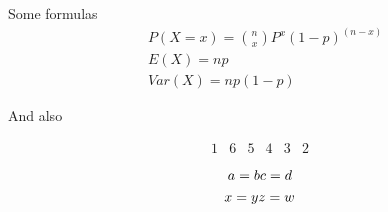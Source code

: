 \documentclass[12pt,a6paper]{article}
\begin{document}
Some formulas
$$
\begin{alignedat}{3}
&P(X=x)={n \choose x}P^x(1-p)^{(n-x)}\\
&E(X)=np\\
&Var(X)=np(1-p)
\end{alignedat}
$$

And also

$$
\begin{array}{|c|c|c||c|c|c|}
1 & 6 & 5 & 4 & 3 & 2
\end{array}
$$

$$
a=b\\
c=d
$$

$$
x=y\newline
z=w
$$
\end{document}

